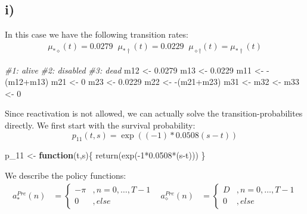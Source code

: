 \documentclass[
]{article}
\newenvironment{Shaded}{\begin{snugshade}}{\end{snugshade}}
\newcommand{\CommentTok}[1]{\textcolor[rgb]{0.56,0.35,0.01}{\textit{#1}}}
\newcommand{\ControlFlowTok}[1]{\textcolor[rgb]{0.13,0.29,0.53}{\textbf{#1}}}
\newcommand{\DecValTok}[1]{\textcolor[rgb]{0.00,0.00,0.81}{#1}}
\newcommand{\FloatTok}[1]{\textcolor[rgb]{0.00,0.00,0.81}{#1}}
\newcommand{\FunctionTok}[1]{\textcolor[rgb]{0.00,0.00,0.00}{#1}}
\newcommand{\NormalTok}[1]{#1}
\newcommand{\OtherTok}[1]{\textcolor[rgb]{0.56,0.35,0.01}{#1}}
\newcommand{\SpecialCharTok}[1]{\textcolor[rgb]{0.00,0.00,0.00}{#1}}
\begin{document}
\hypertarget{i}{%
\subsection{i)}\label{i}}

In this case we have the following transition rates: \[\begin{aligned}
\mu_{*\diamond}(t) = 0.0279 \;\; \mu_{*\dagger}(t) = 0.0229 \;\; \mu_{\diamond \dagger}(t) = \mu_{*\dagger}(t) 
\end{aligned}\]

\begin{Shaded}
\begin{Highlighting}[]
\CommentTok{\#1: alive }
\CommentTok{\#2: disabled}
\CommentTok{\#3: dead}
\NormalTok{m12 }\OtherTok{\textless{}{-}} \FloatTok{0.0279} 
\NormalTok{m13 }\OtherTok{\textless{}{-}} \FloatTok{0.0229}
\NormalTok{m11 }\OtherTok{\textless{}{-}} \SpecialCharTok{{-}}\NormalTok{(m12}\SpecialCharTok{+}\NormalTok{m13)}
\NormalTok{m21 }\OtherTok{\textless{}{-}} \DecValTok{0}
\NormalTok{m23 }\OtherTok{\textless{}{-}} \FloatTok{0.0229}
\NormalTok{m22 }\OtherTok{\textless{}{-}} \SpecialCharTok{{-}}\NormalTok{(m21}\SpecialCharTok{+}\NormalTok{m23)}
\NormalTok{m31 }\OtherTok{\textless{}{-}}\NormalTok{ m32 }\OtherTok{\textless{}{-}}\NormalTok{ m33 }\OtherTok{\textless{}{-}} \DecValTok{0}
\end{Highlighting}
\end{Shaded}

Since reactivation is not allowed, we can actually solve the
transition-probabilites directly. We first start with the survival
probability: \[p_{11}(t,s) = \exp((-1)*0.0508(s-t))\]

\begin{Shaded}
\begin{Highlighting}[]
\NormalTok{p\_11 }\OtherTok{\textless{}{-}} \ControlFlowTok{function}\NormalTok{(t,s)\{}
  \FunctionTok{return}\NormalTok{(}\FunctionTok{exp}\NormalTok{(}\SpecialCharTok{{-}}\DecValTok{1}\SpecialCharTok{*}\FloatTok{0.0508}\SpecialCharTok{*}\NormalTok{(s}\SpecialCharTok{{-}}\NormalTok{t)))}
\NormalTok{\}}
\end{Highlighting}
\end{Shaded}

We describe the policy functions: \[\begin{aligned}
a_{*}^{Pre}(n) &= \begin{cases}
-\pi &, n = 0, \dots, T-1 \\ 
0&,else
\end{cases}
\;\;\;
a_{\diamond}^{Pre}(n) &= \begin{cases}
D &, n = 0, \dots, T-1 \\ 
0&, else
\end{cases}
\end{aligned}\]
\end{document}
